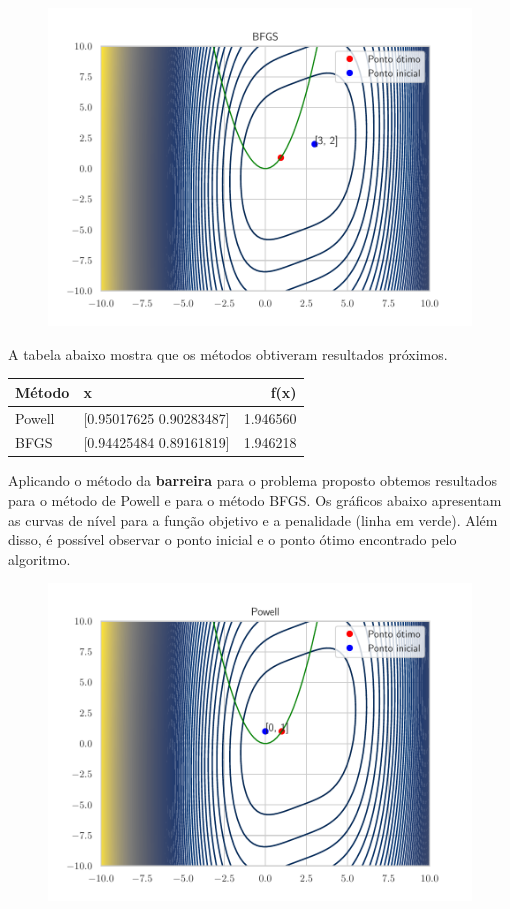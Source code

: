 \documentclass[12pt]{article}
\begin{document}
\begin{figure}[H]
  \centering
  \includegraphics[scale = 0.6]{penalidade_BFGS_[3 2].pdf}
\end{figure}

A tabela abaixo mostra que os métodos obtiveram resultados próximos.

\begin{table}[H]
\centering
\begin{tabular}{llr}
  \hline
  Método & x & f(x) \\
  \hline
  Powell & [0.95017625 0.90283487] & 1.946560 \\
  BFGS & [0.94425484 0.89161819] & 1.946218 \\
  \hline
  \end{tabular}
\end{table}

Aplicando o método da \textbf{barreira} para o problema proposto obtemos resultados para o método de Powell e para o método BFGS. Os gráficos abaixo apresentam as curvas de nível para a função objetivo e a penalidade (linha em verde). Além disso, é possível observar o ponto inicial e o ponto ótimo encontrado pelo algoritmo.

\begin{figure}[H]
  \centering
  \includegraphics[scale = 0.6]{barreira_Powell_[0 1].pdf}
\end{figure}
\end{document}
